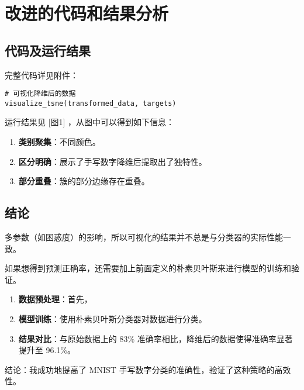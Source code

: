 \documentclass[12pt]{article}
\begin{document}
\section{改进的代码和结果分析}
\subsection{代码及运行结果}

完整代码详见附件：

\begin{verbatim}
# 可视化降维后的数据
visualize_tsne(transformed_data, targets)
\end{verbatim}

运行结果见 [图1] ，从图中可以得到如下信息：

\begin{enumerate}
    \item \textbf{类别聚集}：不同颜色。
    
    \item \textbf{区分明确}：展示了手写数字降维后提取出了独特性。
    
    \item \textbf{部分重叠}：簇的部分边缘存在重叠。
\end{enumerate}


\subsection{结论}

多参数（如困惑度）的影响，所以可视化的结果并不总是与分类器的实际性能一致。

如果想得到预测正确率，还需要加上前面定义的朴素贝叶斯来进行模型的训练和验证。

\begin{enumerate}
    \item \textbf{数据预处理}：首先，

    \item \textbf{模型训练}：使用朴素贝叶斯分类器对数据进行分类。

    \item \textbf{结果对比}：与原始数据上的 83\% 准确率相比，降维后的数据使得准确率显著提升至 96.1\%。
\end{enumerate}

结论：我成功地提高了 MNIST 手写数字分类的准确性，验证了这种策略的高效性。


\clearpage  %
\end{document}
